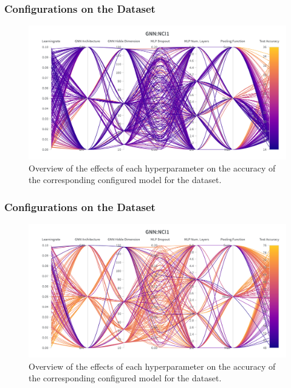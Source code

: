\subsubsection{\gnn Configurations on the \enzymes Dataset}
\begin{figure}[H]
    \centering
    \includegraphics[width=\textwidth, trim={0 75 0 150}, clip]{Figures/hyperparameter_gnn_enzymes.png}
    \caption{Overview of the effects of each hyperparameter on the accuracy of the corresponding configured \gnn model for the \enzymes dataset.}
    \label{fig:wandb_gnn_enzymes}
\end{figure}

\subsubsection{\gnn Configurations on the \imdb Dataset}
\begin{figure}[H]
    \centering
    \includegraphics[width=\textwidth, trim={0 75 0 150}, clip]{Figures/hyperparameter_gnn_imdb.png}
    \caption{Overview of the effects of each hyperparameter on the accuracy of the corresponding configured \gnn model for the \imdb dataset.}
    \label{fig:wandb_gnn_imdb}
\end{figure}
\clearpage

